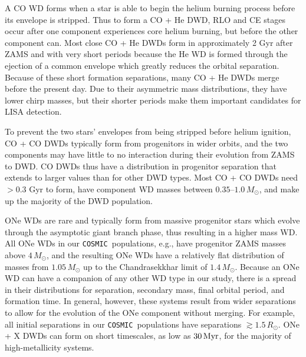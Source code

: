 \documentclass[twocolumn, linenumbers]{aastex631}
\newcommand{\cosmic}{\texttt{COSMIC}}
\begin{document}
A CO WD forms when a star is able to begin the helium burning process 
before its envelope is stripped. Thus to form a CO + He DWD, RLO and CE 
stages occur after one component experiences core helium burning, but 
before the other component can. Most close CO + He DWDs form in 
approximately 2 Gyr after ZAMS and with very short periods because the He 
WD is formed through the ejection of a common envelope which greatly 
reduces the orbital separation. Because of these short formation 
separations, many CO + He DWDs merge before the present day. Due to their 
asymmetric mass distributions, they have lower chirp masses, but their 
shorter periods make them important candidates for LISA detection. 

To prevent the two stars' envelopes from being stripped before helium 
ignition, CO + CO DWDs typically form from progenitors in wider orbits, 
and the two components may have little to no interaction during their 
evolution from ZAMS to DWD. CO DWDs thus have a distribution in progenitor 
separation that extends to larger values than for other DWD types. Most CO 
+ CO DWDs need $> 0.3$ Gyr to form, have component WD masses between 
$0.35$--$1.0\,M_\odot$, and make up the majority of the DWD population. 


ONe WDs are rare and typically form from massive progenitor stars which 
evolve through the asymptotic giant branch phase, thus resulting in a 
higher mass WD. All ONe WDs in our \cosmic\ populations, e.g., have 
progenitor ZAMS masses above $4\,M_\odot$, and the resulting ONe WDs have 
a relatively flat distribution of masses from $1.05\,M_\odot$ up to the 
Chandrasekkhar limit of $1.4\,M_\odot$. Because an ONe WD can have a 
companion of any other WD type in our study, there is a spread in their 
distributions for separation, secondary mass, final orbital period, and 
formation time. In general, however, these systems result from wider 
separations to allow for the evolution of the ONe component without 
merging. For example, all initial separations in our \cosmic \ populations 
have separations $\gtrsim 1.5\,R_\odot$. ONe + X DWDs can form on short 
timescales, as low as $30\,\rm{Myr}$, for the majority of high-metallicity 
systems. 
\end{document}
